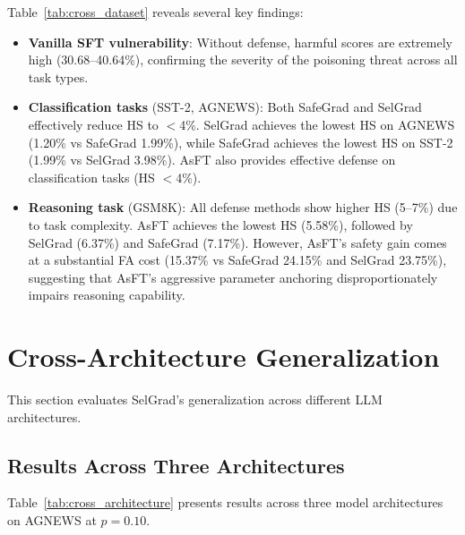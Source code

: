 Table~\ref{tab:cross_dataset} reveals several key findings:

\begin{itemize}
    \item \textbf{Vanilla SFT vulnerability}: Without defense, harmful scores are extremely high (30.68--40.64\%), confirming the severity of the poisoning threat across all task types.
    \item \textbf{Classification tasks} (SST-2, AGNEWS): Both SafeGrad and SelGrad effectively reduce HS to $<$4\%. SelGrad achieves the lowest HS on AGNEWS (1.20\% vs SafeGrad 1.99\%), while SafeGrad achieves the lowest HS on SST-2 (1.99\% vs SelGrad 3.98\%). AsFT also provides effective defense on classification tasks (HS $<$4\%).
    \item \textbf{Reasoning task} (GSM8K): All defense methods show higher HS (5--7\%) due to task complexity. AsFT achieves the lowest HS (5.58\%), followed by SelGrad (6.37\%) and SafeGrad (7.17\%). However, AsFT's safety gain comes at a substantial FA cost (15.37\% vs SafeGrad 24.15\% and SelGrad 23.75\%), suggesting that AsFT's aggressive parameter anchoring disproportionately impairs reasoning capability.
\end{itemize}

\section{Cross-Architecture Generalization}
\label{sec:cross_architecture}

This section evaluates SelGrad's generalization across different LLM architectures.

\subsection{Results Across Three Architectures}
\label{subsec:three_architectures}

Table~\ref{tab:cross_architecture} presents results across three model architectures on AGNEWS at $p=0.10$.

